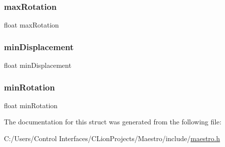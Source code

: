 \subsubsection{\texorpdfstring{max\+Rotation}{maxRotation}}
{\footnotesize\ttfamily float max\+Rotation}

\mbox{\label{struct_rotation_configuration_a7ffb8de9d12db685a3fa2395514b19b6}} 
\subsubsection{\texorpdfstring{min\+Displacement}{minDisplacement}}
{\footnotesize\ttfamily float min\+Displacement}

\mbox{\label{struct_rotation_configuration_a1b43754bfd8f4ed8d4b0fffd628dc9bc}} 
\subsubsection{\texorpdfstring{min\+Rotation}{minRotation}}
{\footnotesize\ttfamily float min\+Rotation}



The documentation for this struct was generated from the following file\+:\begin{DoxyCompactItemize}
\item 
C\+:/\+Users/\+Control Interfaces/\+C\+Lion\+Projects/\+Maestro/include/\hyperlink{maestro_8h}{maestro.\+h}\end{DoxyCompactItemize}
